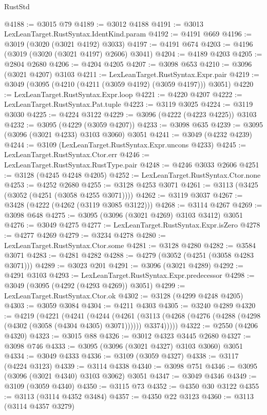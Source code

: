 \begin{lexlean}{RustStd}
\begin{coremodule}
@4188 := @3015 @79
@4189 := @3012 @4188
@4191 := @3013 LexLeanTarget.RustSyntax.IdentKind.param
@4192 := @4191 @669
@4196 := @3019 (@3020 (@3021 @4192) @3033)
@4197 := @4191 @674
@4203 := @4196 (@3019 (@3020 (@3021 @4197) @2606) @3041)
@4204 := @4189 @4203
@4205 := @2804 @2680
@4206 := @4204 @4205
@4207 := @3098 @653
@4210 := @3096 (@3021 @4207) @3103
@4211 := LexLeanTarget.RustSyntax.Expr.pair
@4219 := @3049 (@3095 (@4210 (@4211 (@3059 @4192) (@3059 @4197))) @3051)
@4220 := LexLeanTarget.RustSyntax.Expr.loop
@4221 := @4220 @4207
@4222 := LexLeanTarget.RustSyntax.Pat.tuple
@4223 := @3119 @3025
@4224 := @3119 @3030
@4225 := @4224 @3122
@4229 := @3096 (@4222 (@4223 @4225)) @3103
@4232 := @3095 (@4229 (@3059 @4207))
@4233 := @3098 @635
@4239 := @3095 (@3096 (@3021 @4233) @3103 @3060) @3051
@4241 := @3049 (@4232 @4239)
@4244 := @3109 (LexLeanTarget.RustSyntax.Expr.uncons @4233)
@4245 := LexLeanTarget.RustSyntax.Ctor.err
@4246 := LexLeanTarget.RustSyntax.RustType.pair
@4248 := @4246 @3033 @2606
@4251 := @3128 (@4245 @4248 @4205)
@4252 := LexLeanTarget.RustSyntax.Ctor.none
@4253 := @4252 @2680
@4255 := @3128 @4253 @3071
@4261 := @3113 (@3425 (@3052 (@4251 (@3058 @4255 @3071))))
@4262 := @3119 @3037
@4267 := @3428 (@4222 (@4262 (@3119 @3085 @3122)))
@4268 := @3114 @4267
@4269 := @3098 @648
@4275 := @3095 (@3096 (@3021 @4269) @3103 @3412) @3051
@4276 := @3049 @4275
@4277 := LexLeanTarget.RustSyntax.Expr.isZero
@4278 := @4277 @4269
@4279 := @3234 @4278
@4280 := LexLeanTarget.RustSyntax.Ctor.some
@4281 := @3128 @4280
@4282 := @3584 @3071
@4283 := @4281 @4282
@4288 := @4279 (@3052 (@4251 (@3058 @4283 @3071)))
@4289 := @3023 @201
@4291 := @3096 (@3021 @4289)
@4292 := @4291 @3103
@4293 := LexLeanTarget.RustSyntax.Expr.predecessor
@4298 := @3049 (@3095 (@4292 (@4293 @4269)) @3051)
@4299 := LexLeanTarget.RustSyntax.Ctor.ok
@4302 := @3128 (@4299 @4248 @4205)
@4303 := @3059 @3084
@4304 := @4211 @4303
@4305 := @3240 @4289
@4320 := @4219
    (@4221
      (@4241
        (@4244
          (@4261
            (@3113 (@4268 (@4276 (@4288 (@4298 (@4302 (@3058 (@4304 @4305) @3071)))))) @3374)))))
@4322 := @2550 (@4206 @4320)
@4323 := @3015 @88
@4326 := @3012 @4323 @3445 @2680
@4327 := @3098 @746
@4333 := @3095 (@3096 (@3021 @4327) @3103 @3060) @3051
@4334 := @3049 @4333
@4336 := @3109 (@3059 @4327)
@4338 := @3117 (@4224 @3123)
@4339 := @3114 @4338
@4340 := @3098 @751
@4346 := @3095 (@3096 (@3021 @4340) @3103 @3062) @3051
@4347 := @3049 @4346
@4349 := @3109 (@3059 @4340)
@4350 := @3115 @73
@4352 := @4350 @30 @3122
@4355 := @3113 (@3114 @4352 @3484)
@4357 := @4350 @22 @3123
@4360 := @3113 (@3114 @4357 @3279)

\end{coremodule}
\end{lexlean}
